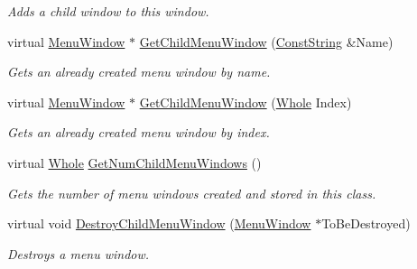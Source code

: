 \begin{DoxyCompactItemize}
\begin{DoxyCompactList}\small\item\em Adds a child window to this window. \item\end{DoxyCompactList}\item 
virtual \hyperlink{classphys_1_1UI_1_1MenuWindow}{MenuWindow} $\ast$ \hyperlink{classphys_1_1UI_1_1MenuWindow_ad1136c4e4b2ff9b9dc5d6aac2dba45a7}{GetChildMenuWindow} (\hyperlink{namespacephys_a5ce5049f8b4bf88d6413c47b504ebb31}{ConstString} \&Name)
\begin{DoxyCompactList}\small\item\em Gets an already created menu window by name. \item\end{DoxyCompactList}\item 
virtual \hyperlink{classphys_1_1UI_1_1MenuWindow}{MenuWindow} $\ast$ \hyperlink{classphys_1_1UI_1_1MenuWindow_ae3ea20dba208e0a44434c55149c3ea5f}{GetChildMenuWindow} (\hyperlink{namespacephys_a460f6bc24c8dd347b05e0366ae34f34a}{Whole} Index)
\begin{DoxyCompactList}\small\item\em Gets an already created menu window by index. \item\end{DoxyCompactList}\item 
virtual \hyperlink{namespacephys_a460f6bc24c8dd347b05e0366ae34f34a}{Whole} \hyperlink{classphys_1_1UI_1_1MenuWindow_ab3a6ae708ba2cea16cd0de176e265459}{GetNumChildMenuWindows} ()
\begin{DoxyCompactList}\small\item\em Gets the number of menu windows created and stored in this class. \item\end{DoxyCompactList}\item 
virtual void \hyperlink{classphys_1_1UI_1_1MenuWindow_ace2796c2d250fe1582f7c43333a7295e}{DestroyChildMenuWindow} (\hyperlink{classphys_1_1UI_1_1MenuWindow}{MenuWindow} $\ast$ToBeDestroyed)
\begin{DoxyCompactList}\small\item\em Destroys a menu window. \item\end{DoxyCompactList}\end{DoxyCompactItemize}
